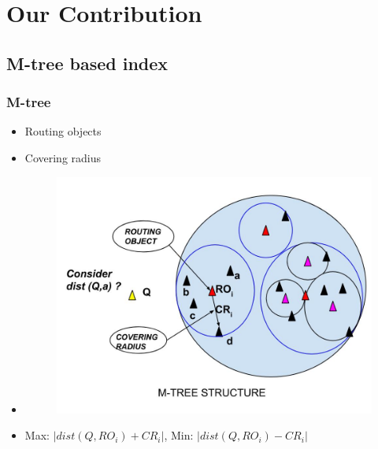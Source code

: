 \documentclass{beamer}
\begin{document}
%
\section{Our Contribution}
%
%	  
%


\subsection{M-tree based index}

\begin{frame}
\frametitle{M-tree}
\begin{overlayarea}{\textwidth}{.8\textheight}

\begin{itemize}
	\item<1-> Routing objects 
	\item<1-> Covering radius
\item<2->[]
\begin{figure}[ht]	
\centering
\includegraphics[width=0.6 \columnwidth]{img/mtree.jpg}
\end{figure}
	\item<3-> Max: $|dist(Q,RO_{i}) + CR_i|$, Min: $|dist(Q,RO_{i}) - CR_i|$	
\end{itemize}
\end{overlayarea}
\end{frame}
\end{document}
